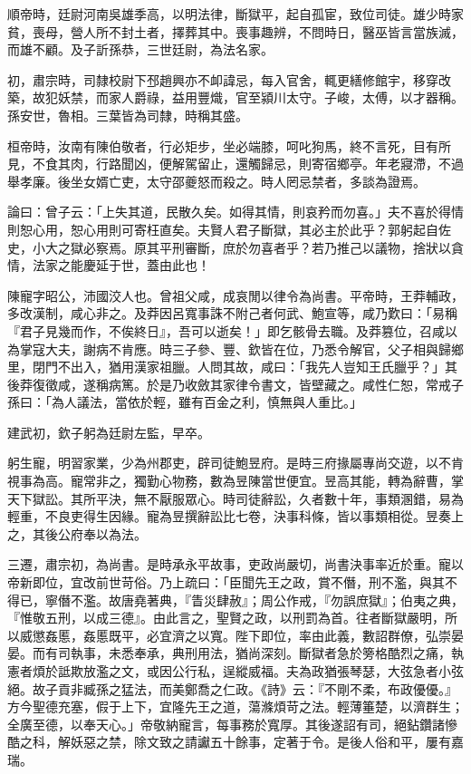 \begin{pinyinscope}
順帝時，廷尉河南吳雄季高，以明法律，斷獄平，起自孤宦，致位司徒。雄少時家貧，喪母，營人所不封土者，擇葬其中。喪事趣辨，不問時日，醫巫皆言當族滅，而雄不顧。及子訢孫恭，三世廷尉，為法名家。

初，肅宗時，司隸校尉下邳趙興亦不卹諱忌，每入官舍，輒更繕修館宇，移穿改築，故犯妖禁，而家人爵祿，益用豐熾，官至潁川太守。子峻，太傅，以才器稱。孫安世，魯相。三葉皆為司隸，時稱其盛。

桓帝時，汝南有陳伯敬者，行必矩步，坐必端膝，呵叱狗馬，終不言死，目有所見，不食其肉，行路聞凶，便解駕留止，還觸歸忌，則寄宿鄉亭。年老寢滯，不過舉孝廉。後坐女婿亡吏，太守邵夔怒而殺之。時人罔忌禁者，多談為證焉。

論曰：曾子云：「上失其道，民散久矣。如得其情，則哀矜而勿喜。」夫不喜於得情則恕心用，恕心用則可寄枉直矣。夫賢人君子斷獄，其必主於此乎？郭躬起自佐史，小大之獄必察焉。原其平刑審斷，庶於勿喜者乎？若乃推己以議物，捨狀以貪情，法家之能慶延于世，蓋由此也！

陳寵字昭公，沛國洨人也。曾祖父咸，成哀閒以律令為尚書。平帝時，王莽輔政，多改漢制，咸心非之。及莽因呂寬事誅不附己者何武、鮑宣等，咸乃歎曰：「易稱『君子見幾而作，不俟終日』，吾可以逝矣！」即乞骸骨去職。及莽篡位，召咸以為掌寇大夫，謝病不肯應。時三子參、豐、欽皆在位，乃悉令解官，父子相與歸鄉里，閉門不出入，猶用漢家祖臘。人問其故，咸曰：「我先人豈知王氏臘乎？」其後莽復徵咸，遂稱病篤。於是乃收斂其家律令書文，皆壁藏之。咸性仁恕，常戒子孫曰：「為人議法，當依於輕，雖有百金之利，慎無與人重比。」

建武初，欽子躬為廷尉左監，早卒。

躬生寵，明習家業，少為州郡吏，辟司徒鮑昱府。是時三府掾屬專尚交遊，以不肯視事為高。寵常非之，獨勤心物務，數為昱陳當世便宜。昱高其能，轉為辭曹，掌天下獄訟。其所平決，無不厭服眾心。時司徒辭訟，久者數十年，事類溷錯，易為輕重，不良吏得生因緣。寵為昱撰辭訟比七卷，決事科條，皆以事類相從。昱奏上之，其後公府奉以為法。

三遷，肅宗初，為尚書。是時承永平故事，吏政尚嚴切，尚書決事率近於重。寵以帝新即位，宜改前世苛俗。乃上疏曰：「臣聞先王之政，賞不僭，刑不濫，與其不得已，寧僭不濫。故唐堯著典，『眚災肆赦』；周公作戒，『勿誤庶獄』；伯夷之典，『惟敬五刑，以成三德』。由此言之，聖賢之政，以刑罰為首。往者斷獄嚴明，所以威懲姦慝，姦慝既平，必宜濟之以寬。陛下即位，率由此義，數詔群僚，弘崇晏晏。而有司執事，未悉奉承，典刑用法，猶尚深刻。斷獄者急於篣格酷烈之痛，執憲者煩於詆欺放濫之文，或因公行私，逞縱威福。夫為政猶張琴瑟，大弦急者小弦絕。故子貢非臧孫之猛法，而美鄭喬之仁政。《詩》云：『不剛不柔，布政優優。』方今聖德充塞，假于上下，宜隆先王之道，蕩滌煩苛之法。輕薄箠楚，以濟群生；全廣至德，以奉天心。」帝敬納寵言，每事務於寬厚。其後遂詔有司，絕鉆鑽諸慘酷之科，解妖惡之禁，除文致之請讞五十餘事，定著于令。是後人俗和平，屢有嘉瑞。


\end{pinyinscope}
